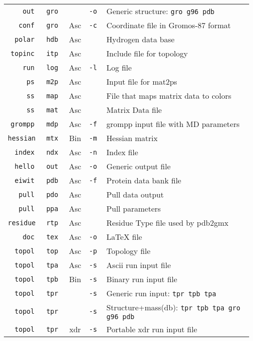 \begin{table}
\begin{tabularx}{\linewidth}{|r@{\tt.}lccX|}
\tt      out & \tt gro &     & \tt -o & Generic structure: \tt gro g96 pdb \\[-0.12ex]
\tt     conf & \tt gro & Asc & \tt -c & Coordinate file in Gromos-87 format \\[-0.12ex]
\tt    polar & \tt hdb & Asc & \tt    & Hydrogen data base \\[-0.12ex]
\tt   topinc & \tt itp & Asc & \tt    & Include file for topology \\[-0.12ex]
\tt      run & \tt log & Asc & \tt -l & Log file \\[-0.12ex]
\tt       ps & \tt m2p & Asc & \tt    & Input file for mat2ps \\[-0.12ex]
\tt       ss & \tt map & Asc & \tt    & File that maps matrix data to colors \\[-0.12ex]
\tt       ss & \tt mat & Asc & \tt    & Matrix Data file \\[-0.12ex]
\tt   grompp & \tt mdp & Asc & \tt -f & grompp input file with MD parameters \\[-0.12ex]
\tt  hessian & \tt mtx & Bin & \tt -m & Hessian matrix \\[-0.12ex]
\tt    index & \tt ndx & Asc & \tt -n & Index file \\[-0.12ex]
\tt    hello & \tt out & Asc & \tt -o & Generic output file \\[-0.12ex]
\tt    eiwit & \tt pdb & Asc & \tt -f & Protein data bank file \\[-0.12ex]
\tt     pull & \tt pdo & Asc & \tt    & Pull data output \\[-0.12ex]
\tt     pull & \tt ppa & Asc & \tt    & Pull parameters \\[-0.12ex]
\tt  residue & \tt rtp & Asc & \tt    & Residue Type file used by pdb2gmx \\[-0.12ex]
\tt      doc & \tt tex & Asc & \tt -o & LaTeX file \\[-0.12ex]
\tt    topol & \tt top & Asc & \tt -p & Topology file \\[-0.12ex]
\tt    topol & \tt tpa & Asc & \tt -s & Ascii run input file \\[-0.12ex]
\tt    topol & \tt tpb & Bin & \tt -s & Binary run input file \\[-0.12ex]
\tt    topol & \tt tpr &     & \tt -s & Generic run input: \tt tpr tpb tpa \\[-0.12ex]
\tt    topol & \tt tpr &     & \tt -s & Structure+mass(db): \tt tpr tpb tpa gro g96 pdb\\[-0.12ex]
\tt    topol & \tt tpr & xdr & \tt -s & Portable xdr run input file \\[-0.12ex]

\end{tabularx}
\end{table}
